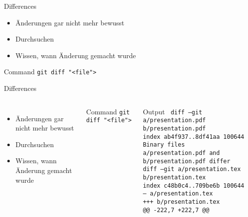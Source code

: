 \documentclass[xcolor=dvipsnames]{beamer}
\begin{document}
    \begin{frame}{Differences}
      \begin{itemize}[<+->]
        \item Änderungen gar nicht mehr bewusst
        \item Durchsuchen
        \item Wissen, wann Änderung gemacht wurde
      \end{itemize}
      \begin{block}{Command}
        \texttt{git diff "<file">}
      \end{block}
    \end{frame}

    \begin{frame}{Differences}
      \begin{columns}
          \begin{itemize}
            \item Änderungen gar nicht mehr bewusst
            \item Durchsuchen
            \item Wissen, wann Änderung gemacht wurde
          \end{itemize}
          \begin{block}{Command}
            \texttt{git diff "<file">}
          \end{block}
          \vspace{20pt}
            \begin{block}{Output}
              \texttt{
                diff --git a/presentation.pdf b/presentation.pdf                \\
                index ab4f937..8df41aa 100644                                   \\
                Binary files a/presentation.pdf and b/presentation.pdf differ   \\
                diff --git a/presentation.tex b/presentation.tex                \\
                index c48b0c4..709be6b 100644                                   \\
                {\color{red}--- a/presentation.tex}                             \\
                {\color{green}+++ b/presentation.tex}                           \\
                @@ -222,7 +222,7 @@
              }
            \end{block}
      \end{columns}
    \end{frame}
\end{document}
